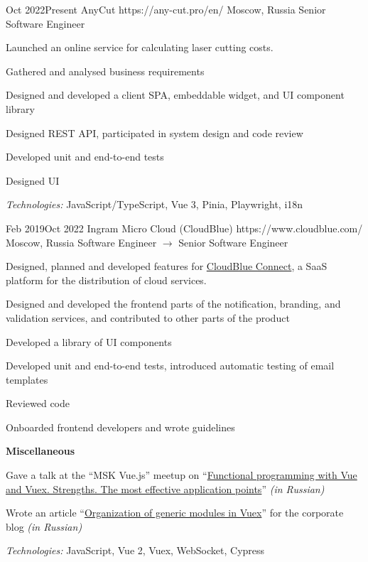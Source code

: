 \documentclass[10pt]{article}
\begin{document}
\job
	{Oct 2022}{Present}
	{AnyCut}
	{https://any-cut.pro/en/}
	{Moscow, Russia}
	{Senior Software Engineer}
	{
	  Launched an online service for calculating laser cutting costs.

	  \begin{supercompactitemize}
	  	\item Gathered and analysed business requirements
		\item Designed and developed a client SPA, embeddable widget, and UI component library
		\item Designed REST API, participated in system design and code review
		\item Developed unit and end-to-end tests
		\item Designed UI
	  \end{supercompactitemize}

	  \textit{Technologies:} JavaScript/TypeScript, Vue 3, Pinia, Playwright, i18n
	}

\job
	{Feb 2019}{Oct 2022}
	{Ingram Micro Cloud (CloudBlue)}
	{https://www.cloudblue.com/}
	{Moscow, Russia}
	{Software Engineer $\rightarrow$ Senior Software Engineer}
	{
	  Designed, planned and developed features for \href{https://connect.cloudblue.com/community/}{CloudBlue Connect}, a SaaS platform for the distribution of cloud services.

	  \begin{supercompactitemize}
	  	\item Designed and developed the frontend parts of the notification, branding, and validation services, and contributed to other parts of the product
	  	\item Developed a library of UI components
	  	\item Developed unit and end-to-end tests, introduced automatic testing of email templates
	  	\item Reviewed code
	  	\item Onboarded frontend developers and wrote guidelines
	  \end{supercompactitemize}

	  \textbf{Miscellaneous}

	  \begin{supercompactitemize}
		\item Gave a talk at the ``MSK Vue.js'' meetup on ``\href{https://www.youtube.com/watch?v=Rz_RynHNZKg}{Functional programming with Vue and Vuex. Strengths. The most effective application points}'' \textit{(in Russian)}
		\item Wrote an article ``\href{https://habr.com/ru/company/odin_ingram_micro/blog/526094/}{Organization of generic modules in Vuex}'' for the corporate blog \textit{(in Russian)}
	  \end{supercompactitemize}

	  \textit{Technologies:} JavaScript, Vue 2, Vuex, WebSocket, Cypress
	}
\end{document}
